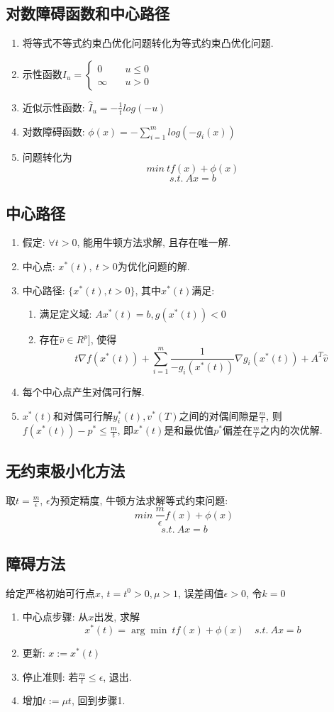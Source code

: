 \documentclass[UTF8]{article}
\begin{document}
\subsection{对数障碍函数和中心路径}

\begin{enumerate}
	\item 将等式不等式约束凸优化问题转化为等式约束凸优化问题.
	\item 示性函数$I_u=\begin{cases}
	0&\quad u\leq 0\\
	\infty&\quad u>0
	\end{cases}$
	\item 近似示性函数: $\hat{I}_u=-\frac{1}{t}log(-u)$
	\item 对数障碍函数: $\phi(x)=-\sum\limits_{i=1}^m log(-g_i(x))$
	\item 问题转化为
	$$min\ tf(x)+\phi(x)$$
	$$s.t.\ Ax=b$$
\end{enumerate}
\subsection{中心路径}
\begin{enumerate}
	\item 假定: $\forall t > 0$, 能用牛顿方法求解, 且存在唯一解.
	\item 中心点: $x^*(t),\ t>0$为优化问题的解.
	\item 中心路径: $\{x^*(t),t>0\}$, 其中$x^*(t)$满足: 
		\begin{enumerate}
			\item 满足定义域: $Ax^*(t)=b, g(x^*(t))<0$
			\item 存在$\hat{v}\in R^p]$, 使得$$t\nabla f(x^*(t))+\sum\limits_{i=1}^m \frac{1}{-g_i(x^*(t))} \nabla g_i(x^*(t))+A^T \hat{v}$$
		\end{enumerate}
	\item 每个中心点产生对偶可行解.
	\item $x^*(t)$和对偶可行解$y_i^*(t), v^*(T)$之间的对偶间隙是$\frac{m}{t}$, 则$f(x^*(t))-p^*\leq \frac{m}{t}$, 即$x^*(t)$是和最优值$p^*$偏差在$\frac{m}{t}$之内的次优解.
\end{enumerate}

\subsection{无约束极小化方法}
取$t=\frac{m}{\epsilon}$, $\epsilon$为预定精度, 牛顿方法求解等式约束问题:
$$min\ \frac{m}{\epsilon}f(x)+\phi(x)$$
$$s.t.\ Ax=b$$
\subsection{障碍方法}
给定严格初始可行点$x$, $t=t^0>0,\mu>1$, 误差阈值$\epsilon>0$, 令$k=0$
\begin{enumerate}
	\item 中心点步骤: 从$x$出发, 求解$$x^*(t)=\arg\min\ tf(x)+\phi(x)\quad s.t.\ Ax=b$$
	\item 更新: $x:=x^*(t)$
	\item 停止准则: 若$\frac{m}{t}\leq \epsilon$, 退出.
	\item 增加$t:=\mu t$, 回到步骤1.
\end{enumerate} 
\end{document}
